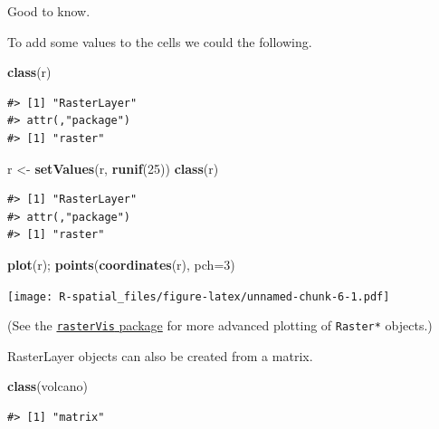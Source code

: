 \documentclass[]{book}
\newenvironment{Shaded}{\begin{snugshade}}{\end{snugshade}}
\newcommand{\KeywordTok}[1]{\textcolor[rgb]{0.13,0.29,0.53}{\textbf{#1}}}
\newcommand{\DataTypeTok}[1]{\textcolor[rgb]{0.13,0.29,0.53}{#1}}
\newcommand{\DecValTok}[1]{\textcolor[rgb]{0.00,0.00,0.81}{#1}}
\newcommand{\StringTok}[1]{\textcolor[rgb]{0.31,0.60,0.02}{#1}}
\newcommand{\NormalTok}[1]{#1}
\begin{document}
Good to know.

To add some values to the cells we could the following.

\begin{Shaded}
\begin{Highlighting}[]
\KeywordTok{class}\NormalTok{(r)}
\end{Highlighting}
\end{Shaded}

\begin{verbatim}
#> [1] "RasterLayer"
#> attr(,"package")
#> [1] "raster"
\end{verbatim}

\begin{Shaded}
\begin{Highlighting}[]
\NormalTok{r <-}\StringTok{ }\KeywordTok{setValues}\NormalTok{(r, }\KeywordTok{runif}\NormalTok{(}\DecValTok{25}\NormalTok{))}
\KeywordTok{class}\NormalTok{(r)}
\end{Highlighting}
\end{Shaded}

\begin{verbatim}
#> [1] "RasterLayer"
#> attr(,"package")
#> [1] "raster"
\end{verbatim}

\begin{Shaded}
\begin{Highlighting}[]
\KeywordTok{plot}\NormalTok{(r); }\KeywordTok{points}\NormalTok{(}\KeywordTok{coordinates}\NormalTok{(r), }\DataTypeTok{pch=}\DecValTok{3}\NormalTok{)}
\end{Highlighting}
\end{Shaded}

\texttt{[image: R-spatial\_files/figure-latex/unnamed-chunk-6-1.pdf]}

(See the
\href{https://cran.r-project.org/web/packages/rasterVis/index.html}{\texttt{rasterVis}
package} for more advanced plotting of \texttt{Raster*} objects.)

RasterLayer objects can also be created from a matrix.

\begin{Shaded}
\begin{Highlighting}[]
\KeywordTok{class}\NormalTok{(volcano)}
\end{Highlighting}
\end{Shaded}

\begin{verbatim}
#> [1] "matrix"
\end{verbatim}
\end{document}
